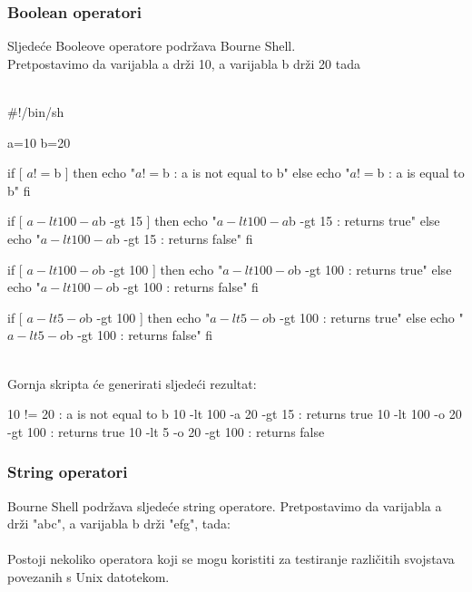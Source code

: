 \documentclass[11pt]{book}
\begin{document}
\subsubsection{Boolean operatori}

Sljedeće Booleove operatore podržava Bourne Shell. \\

Pretpostavimo da varijabla a drži 10, a varijabla b drži 20 tada\\
\\

\begin{shortlisting}
#!/bin/sh

a=10
b=20

if [ $a != $b ]
then
    echo "$a != $b : a is not equal to b"
else
    echo "$a != $b : a is equal to b"
fi

if [ $a -lt 100 -a $b -gt 15 ]
then
    echo "$a -lt 100 -a $b -gt 15 : returns true"
else
    echo "$a -lt 100 -a $b -gt 15 : returns false"
fi

if [ $a -lt 100 -o $b -gt 100 ]
then 
    echo "$a -lt 100 -o $b -gt 100 : returns true"
else 
    echo "$a -lt 100 -o $b -gt 100 : returns false"
fi

if [ $a -lt 5 -o $b -gt 100 ]
then
    echo "$a -lt 5 -o $b -gt 100 : returns true"
else
    echo "$a -lt 5 -o $b -gt 100 : returns false"
fi
\end{shortlisting}\\

Gornja skripta će generirati sljedeći rezultat:\\

\begin{shortlisting}
10 != 20 : a is not equal to b
10 -lt 100 -a 20 -gt 15 : returns true
10 -lt 100 -o 20 -gt 100 : returns true
10 -lt 5 -o 20 -gt 100 : returns false
\end{shortlisting}

\subsubsection{String operatori}
Bourne Shell podržava sljedeće string operatore. Pretpostavimo da varijabla a drži "abc", a varijabla b drži "efg", tada:\\

\\

Postoji nekoliko operatora koji se mogu koristiti za testiranje različitih svojstava povezanih s Unix datotekom.\\
\end{document}

